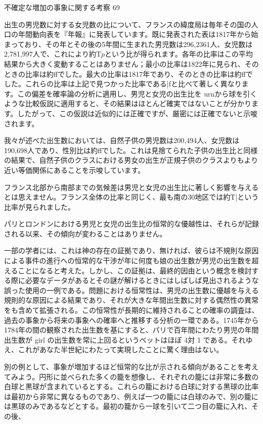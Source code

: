 \documentclass[a4paper,11pt,openany]{ltjsbook}
\begin{document}
不確定な増加の事象に関する考察 69

出生の男児数に対する女児数の比について、フランスの緯度局は毎年その国の人口の年間動向表を『年報』に発表しています。既に発表された表は1817年から始まっており、その年とその後の5年間に生まれた男児数は296,2361人、女児数は2,781,997人で、これにより約T$p$という比が得られます。各年の比率はこの平均結果から大きく変動することはありません；最小の比率は1822年に見られ、そのときの比率は約ffでした。最大の比率は1817年であり、そのときの比率は約ffでした。これらの比率は上記で見つかった比率である|fと比べて著しく異なります。この偏差を確率論の分析に適用し、男児と女児の出生比を urnから球を引くような比較仮説に適用すると、その結果はほとんど確実ではないことが分かります。したがって、この仮説は近似的には正確ですが、厳密には正確でないと示唆されます。

我々が述べた出生数においては、自然子供の男児数は200,494人、女児数は190,698人であり、性別比は約ffでした。これは見捨てられた子供の出生比と同様の結果で、自然子供のクラスにおける男女の出生が正規子供のクラスよりもより近い等価関係にあることを示唆しています。

フランス北部から南部までの気候差は男児と女児の出生比に著しく影響を与えるとは思えません。フランス全体の比率と同じく、最も南の30地区では約T|という比率が見られました。

パリとロンドンにおける男児と女児の出生比の恒常的な優越性は、それらが記録される以来、その傾向が変わることはありません。

一部の学者には、これは神の存在の証拠であり、無ければ、彼らは不規則な原因による事件の進行への恒常的な干渉が年に何度も娘の出生数が男児の出生数を超えることになると考えた。しかし、この証拠は、最終的因由という概念を検討する際に必要なデータがあるとその謎が解けるときにはしばしば見出されるような誤った使用の一例である。問題における恒常性は、男児の出生数に優越を与える規則的な原因による結果であり、それが大きな年間出生数に対する偶然性の異常をも含めて拡張される。この恒常性が長期的に維持されることの確率の調査は、過去の事象から将来の事象への確率へと推移する分析の一環である。1745年から1784年の間の観察された出生数を基にすると、パリで百年間にわたり男児の年間出生数が girl の出生数を常に上回るというベットはほぼ 4対 1 である。それゆえ、これがあなた半世紀にわたって実現したことに驚く理由はない。

別の例として、事象が増加するほど恒常的な比が示される傾向があることを考えてみよう。円形に並べられた多くの籠を想像し、それぞれの籠には非常に多数の白球と黒球が含まれているとする。これらの籠における白球に対する黒球の比率は最初から非常に異なるものであり、例えば一つの籠には白球のみで、別の籠には黒球のみであるなどとする。最初の籠から一球を引いて二つ目の籠に入れ、その後、
\end{document}
